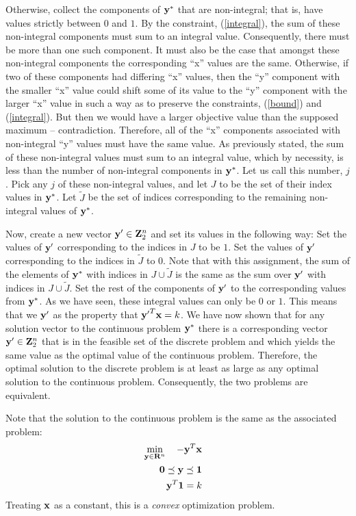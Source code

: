 \documentclass[12pt]{article}
\begin{document}
Otherwise, collect the components of ${\bf y}^*$ 
that are non-integral; that is, have values strictly between $0$ and $1$.
By the constraint, (\ref{integral}), the sum of these non-integral components
must sum to an integral value. Consequently, there must be more than one such
component. It must also be the case that amongst these non-integral components 
the corresponding ``x'' values are the same. Otherwise, if two of these components 
had differing ``x'' values, then the ``y'' component with the 
smaller ``x'' value could shift some of its value to the ``y'' component with 
the larger ``x'' value in such a way as to preserve the constraints, 
(\ref{bound}) and (\ref{integral}). 
But then we would have a larger objective value than the supposed maximum 
-- contradiction. Therefore, all of the 
``x'' components associated with non-integral ``y'' values must have the same 
value. As previously stated, the sum of these non-integral values must sum 
to an integral value, which by necessity, is less than the number of 
non-integral components in ${\bf y}^*$. Let us call this number, $j$. 
Pick any $j$ of these non-integral values, and let $J$ to be the set of their index
values in ${\bf y}^*$.
Let ${\tilde J}$ be the set of indices corresponding to the remaining non-integral values
of ${\bf y}^*$.

Now, create a new 
vector ${\bf y}^\prime \in {\bf Z}_2^n$ and set its values in the following way: 
Set the values of ${\bf y}^\prime$ corresponding to the indices in $J$
to be $1$. Set the values of ${\bf y}^\prime$ corresponding to the indices in ${\tilde J}$
to $0$. Note that with this assignment, the sum of the elements of 
${\bf y}^*$ with indices in $J \cup {\tilde J}$ is the same as the sum over ${\bf y}^\prime$ 
with indices in $J \cup {\tilde J}$.
Set the rest of the components of ${\bf y}^\prime$ to the 
corresponding values from ${\bf y}^*$. As we have seen, these integral values 
can only be $0$ or $1$. This means that we ${\bf y}^\prime$ as the property that
${{\bf y}^\prime}^T {\bf x} = k$. We have now shown that for any 
solution vector to the continuous problem ${\bf y}^*$ there is a corresponding vector
${\bf y}^\prime \in {\bf Z}_2^n$ that is in the feasible set of the discrete problem 
and which yields the same value as the optimal value of the continuous problem.
Therefore, the optimal solution to the discrete problem is at least as large as 
any optimal solution to the continuous problem. Consequently, the two problems are 
equivalent.

Note that the solution to the continuous problem is the same as the associated problem:
\begin{eqnarray}
	\mathop{\rm min}_{{\bf y} \in {\bf R}^n}\limits \quad -{\bf y}^T {\bf x} && \label{op1} \\ 
	{\bf 0} \preceq {\bf y} \preceq {\bf 1} &&  \label{op2}\\
	{\bf y}^T {\bf 1} =  k \label{op3} &&
\end{eqnarray}
Treating ${\bf x}$ as a constant, this is a {\it convex\/} optimization problem.
\end{document}
